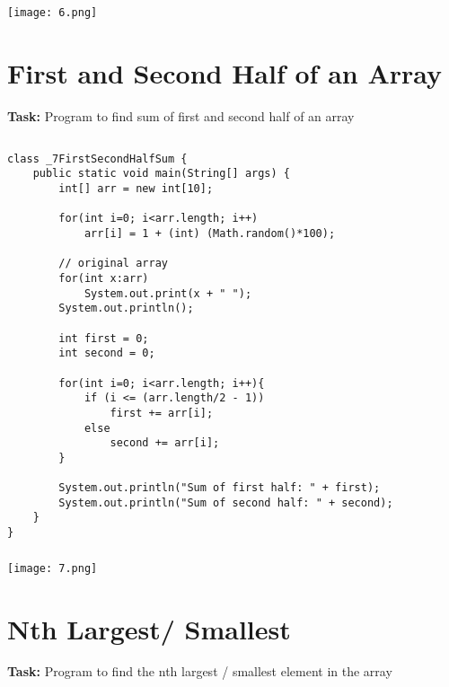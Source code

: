 \documentclass[12pt,a4paper]{article}
\begin{document}
\subsubsection{}
\begin{center}
    \texttt{[image: 6.png]}
\end{center}


\section{First and Second Half of an Array}
\textbf{Task:} Program to find sum of first and second half of an array

\subsection{}
\begin{lstlisting}
class _7FirstSecondHalfSum {
    public static void main(String[] args) {
        int[] arr = new int[10];
    
        for(int i=0; i<arr.length; i++)
            arr[i] = 1 + (int) (Math.random()*100);
    
        // original array
        for(int x:arr)
            System.out.print(x + " ");
        System.out.println();
    
        int first = 0;
        int second = 0;
    
        for(int i=0; i<arr.length; i++){
            if (i <= (arr.length/2 - 1))
                first += arr[i];
            else 
                second += arr[i];
        }
    
        System.out.println("Sum of first half: " + first);
        System.out.println("Sum of second half: " + second);
    }
}
\end{lstlisting}

\subsubsection{}
\begin{center}
    \texttt{[image: 7.png]}
\end{center}


\section{Nth Largest/ Smallest}
\textbf{Task:} Program to find the nth largest / smallest element in the array
\end{document}
